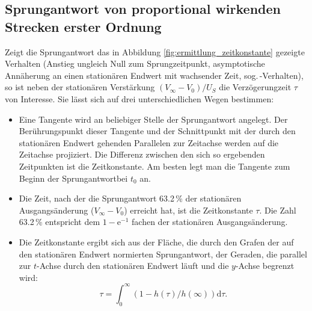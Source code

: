 \subsection{Sprungantwort von proportional wirkenden Strecken erster Ordnung} \label{sec:pt_1-glied}
Zeigt die Sprungantwort das in Abbildung \ref{fig:ermittlung_zeitkonstante} gezeigte Verhalten (Anstieg ungleich Null zum Sprungzeitpunkt, asymptotische Annäherung an einen stationären Endwert mit wachsender Zeit, sog.\,\PT-Verhalten), so ist neben der stationären Verstärkung $(V_\infty - V_0)/U_S$ die Verzögerungzeit $\tau$ von Interesse.
Sie lässt sich auf drei unterschiedlichen Wegen bestimmen:
\begin{itemize}
    \item Eine Tangente wird an beliebiger Stelle der Sprungantwort angelegt. Der Berührungspunkt dieser Tangente und der Schnittpunkt mit der durch den stationären Endwert gehenden Parallelen zur Zeitachse werden auf die Zeitachse projiziert. Die Differenz zwischen den sich so ergebenden Zeitpunkten ist die Zeitkonstante. Am besten legt man die Tangente zum Beginn der Sprungantwortbei $t_0$ an.
    \item Die Zeit, nach der die Sprungantwort 63.2\,\% der stationären Ausgangsänderung ($V_\infty - V_0$) erreicht hat, ist die Zeitkonstante $\tau$. Die Zahl 63.2\,\% entspricht dem $1-\mathrm{e}^{-1}$ fachen der stationären Ausgangsänderung.
    \item Die Zeitkonstante ergibt sich aus der Fläche, die durch den Grafen der auf den stationären Endwert normierten Sprungantwort, der Geraden, die parallel zur $t$-Achse durch den stationären Endwert läuft und die $y$-Achse begrenzt wird:
    \begin{equation*}
        \tau = \int_0^\infty(1-h(\tau)/h(\infty))\text{d}\tau.
    \end{equation*}
\end{itemize}

